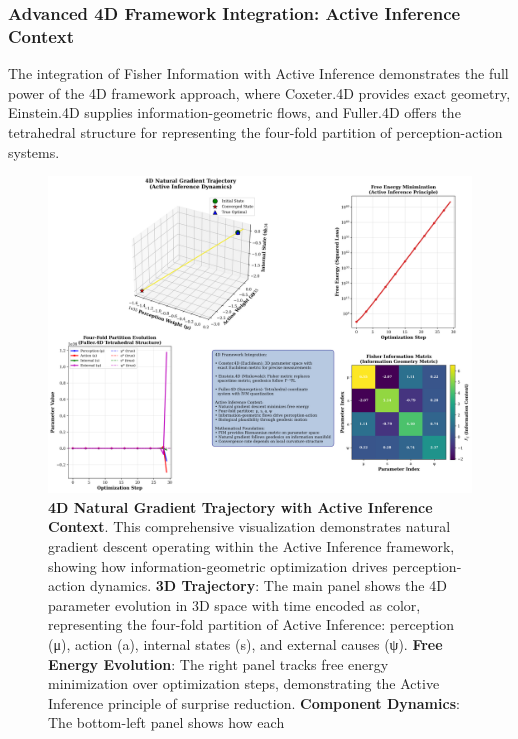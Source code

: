 \documentclass[
  10pt,
]{article}
\begin{document}
\hypertarget{advanced-4d-framework-integration-active-inference-context}{%
\subsubsection{Advanced 4D Framework Integration: Active Inference
Context}\label{advanced-4d-framework-integration-active-inference-context}}

The integration of Fisher Information with Active Inference demonstrates
the full power of the 4D framework approach, where Coxeter.4D provides
exact geometry, Einstein.4D supplies information-geometric flows, and
Fuller.4D offers the tetrahedral structure for representing the
four-fold partition of perception-action systems.

\begin{figure}
\centering
\includegraphics{../output/figures/figure_13_4d_trajectory.png}
\caption{\textbf{4D Natural Gradient Trajectory with Active Inference
Context}. This comprehensive visualization demonstrates natural gradient
descent operating within the Active Inference framework, showing how
information-geometric optimization drives perception-action dynamics.
\textbf{3D Trajectory}: The main panel shows the 4D parameter evolution
in 3D space with time encoded as color, representing the four-fold
partition of Active Inference: perception (μ), action (a), internal
states (s), and external causes (ψ). \textbf{Free Energy Evolution}: The
right panel tracks free energy minimization over optimization steps,
demonstrating the Active Inference principle of surprise reduction.
\textbf{Component Dynamics}: The bottom-left panel shows how each
}
\end{figure}
\end{document}
